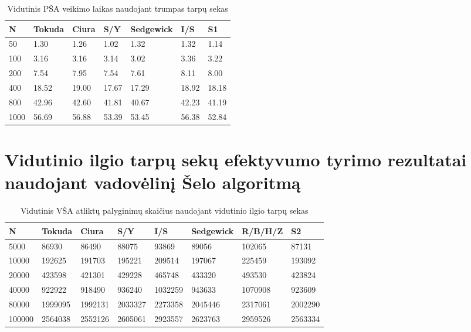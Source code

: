 \documentclass{VUMIFInfKursinis}
\begin{document}
\begin{table}[H]
  \caption{Vidutinis PŠA veikimo laikas naudojant trumpas tarpų sekas}
  \label{iss_small_runtimes}
  \begin{tabular}{|l|l|l|l|l|l|l|}
  \hline
  N    & Tokuda & Ciura & S/Y   & Sedgewick & I/S   & S1    \\ \hline
  50   & 1.30   & 1.26  & 1.02  & 1.32      & 1.32  & 1.14  \\ \hline
  100  & 3.16   & 3.16  & 3.14  & 3.02      & 3.36  & 3.22  \\ \hline
  200  & 7.54   & 7.95  & 7.54  & 7.61      & 8.11  & 8.00  \\ \hline
  400  & 18.52  & 19.00 & 17.67 & 17.29     & 18.92 & 18.18 \\ \hline
  800  & 42.96  & 42.60 & 41.81 & 40.67     & 42.23 & 41.19 \\ \hline
  1000 & 56.69  & 56.88 & 53.39 & 53.45     & 56.38 & 52.84 \\ \hline
  \end{tabular}
  \end{table}

\section{Vidutinio ilgio tarpų sekų efektyvumo tyrimo rezultatai naudojant vadovėlinį Šelo algoritmą}

\begin{table}[H]
  \caption{Vidutinis VŠA atliktų palyginimų skaičius naudojant vidutinio ilgio tarpų sekas}
  \label{tss_medium_comparisons}
  \begin{tabular}{|l|l|l|l|l|l|l|l|}
  \hline
  N      & Tokuda  & Ciura   & S/Y     & I/S     & Sedgewick & R/B/H/Z & S2     \\ \hline
  5000   & 86930   & 86490   & 88075   & 93869   & 89056     & 102065  & 87131   \\ \hline
  10000  & 192625  & 191703  & 195221  & 209514  & 197067    & 225459  & 193092  \\ \hline
  20000  & 423598  & 421301  & 429228  & 465748  & 433320    & 493530  & 423824  \\ \hline
  40000  & 922922  & 918490  & 936240  & 1032259 & 943633    & 1070908 & 923609  \\ \hline
  80000  & 1999095 & 1992131 & 2033327 & 2273358 & 2045446   & 2317061 & 2002290 \\ \hline
  100000 & 2564038 & 2552126 & 2605061 & 2923557 & 2623763   & 2959526 & 2563334 \\ \hline
  \end{tabular}
\end{table}
\end{document}

